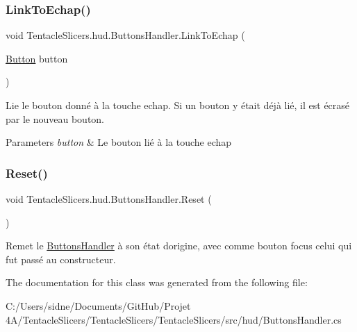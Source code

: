 \mbox{\label{class_tentacle_slicers_1_1hud_1_1_buttons_handler_afb17709bbc0a405595a61c4f2a09ad8b}} 
\subsubsection{\texorpdfstring{Link\+To\+Echap()}{LinkToEchap()}}
{\footnotesize\ttfamily void Tentacle\+Slicers.\+hud.\+Buttons\+Handler.\+Link\+To\+Echap (\begin{DoxyParamCaption}\item[{\hyperlink{class_tentacle_slicers_1_1hud_1_1_button}{Button}}]{button }\end{DoxyParamCaption})}



Lie le bouton donné à la touche echap. Si un bouton y était déjà lié, il est écrasé par le nouveau bouton. 


\begin{DoxyParams}{Parameters}
{\em button} & Le bouton lié à la touche echap \\
\hline
\end{DoxyParams}
\mbox{\label{class_tentacle_slicers_1_1hud_1_1_buttons_handler_a9da242600dd5a643bd3247157ef557cc}} 
\subsubsection{\texorpdfstring{Reset()}{Reset()}}
{\footnotesize\ttfamily void Tentacle\+Slicers.\+hud.\+Buttons\+Handler.\+Reset (\begin{DoxyParamCaption}{ }\end{DoxyParamCaption})}



Remet le \hyperlink{class_tentacle_slicers_1_1hud_1_1_buttons_handler}{Buttons\+Handler} à son état d\textquotesingle{}origine, avec comme bouton focus celui qui fut passé au constructeur. 



The documentation for this class was generated from the following file\+:\begin{DoxyCompactItemize}
\item 
C\+:/\+Users/sidne/\+Documents/\+Git\+Hub/\+Projet 4\+A/\+Tentacle\+Slicers/\+Tentacle\+Slicers/\+Tentacle\+Slicers/src/hud/Buttons\+Handler.\+cs\end{DoxyCompactItemize}
